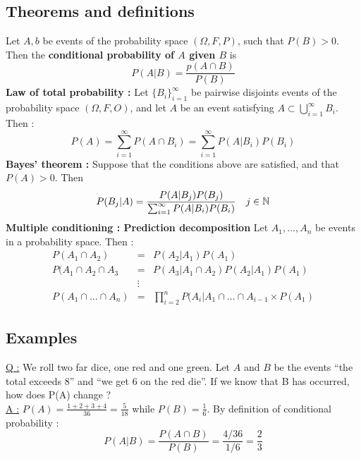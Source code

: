 \documentclass[12pt,a4paper]{article}
\begin{document}
\subsection{Theorems and definitions}
 Let $A,b$ be events of the probability space $(\Omega, F, P)$, such that $P(B) > 0$. Then the \textbf{conditional probability of $A$ given $B$} is 
\begin{equation}
    P(A|B) = \frac{p(A \cap B)}{P(B)}
    \label{equ: conditional probability}
\end{equation}
 \textbf{Law of total probability :} Let $\{B_i\}^\infty_{i=1}$ be pairwise disjoints events of the probability space $(\Omega, F, O)$, and let $A$ be an event satisfying $A \subset \bigcup_{i=1}^\infty B_i$. Then :
\begin{equation}
    P(A) = \sum_{i=1}^{\infty} P(A\cap B_i) = \sum_{i=1}^{\infty}P(A|B_i)P(B_i)
\end{equation}
 \textbf{Bayes' theorem :} Suppose that the conditions above are satisfied, and that $P(A) > 0$. Then 
\begin{equation}
    P(B_j|A) = \frac{P(A|B_j)P(B_j)}{\sum_{i=1}^{\infty}P(A|B_i)P(B_i)} \quad j\in \mathbb{N}
\end{equation}
 \textbf{Multiple conditioning : Prediction decomposition} Let $A_1,...,A_n$ be events in a probability space. Then :
\begin{equation}
    \begin{array}{rcl}
        P(A_1 \cap A_2) & = & P(A_2|A_1)P(A_1)\\
        P(A_1 \cap A_2 \cap A_3 & = & P(A_3|A_1\cap A_2)P(A_2|A_1)P(A_1)\\
        &\vdots&\\
        P(A_1\cap \ldots \cap A_n) & = & \prod_{i=2}^{n} P(A_i|A_1 \cap \ldots \cap A_{i-1} \times P(A_1)
    \end{array}
\end{equation}
\subsection{Examples}
 \uline{Q :} We roll two far dice, one red and one green. Let $A$ and $B$ be the events ``the total exceeds 8'' and ``we get 6 on the red die''. If we know that B has occurred, how does P(A) change ?\\
\uline{A :} $P(A) = \frac{1+2+3+4}{36} = \frac{5}{18}$ while $P(B) = \frac{1}{6}$. By definition of conditional probability :
\[P(A|B) = \frac{P(A\cap B)}{P(B)} = \frac{4/36}{1/6} = \frac{2}{3}\]
\end{document}
